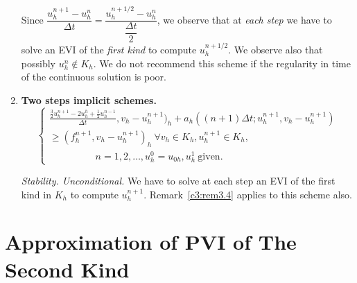 \begin{enumerate}
Since $\dfrac {u^{n+1}_h -u^n_h} {\Delta  t} = \dfrac{u^{n+1/2}_h
  -u^n_h} {\dfrac{\Delta  t}{2}}$, we observe that at \textit{each
  step} we have to solve an EVI of the \textit {first kind} to compute
$u^{n+1/2}_h$. We observe also that possibly $u^n_h \notin K_h$. We do
not recommend this scheme if the regularity in time of the continuous
solution is poor. 

\item {\bf Two steps implicit schemes.}
\begin{equation}
\begin{cases}
\frac{\frac{3}{2} u^{n+1}_h - 2u_h^h +\frac{1}{2} u^{n-1}_h }{\Delta  t}, v_h -u^{n+1}_h )_h +a_h ((n+1) \Delta  t; u^{n+1}_h, v_h -u^{n+1}_h) \\
\geq (f^{n+1}_h, v_h -u^{n+1}_h)_h \ \forall v_h \in K_h, u^{n+1}_h
\in K_h,\\ 
\hspace{2cm}n = 1, 2, \ldots, u^0_h= u_{0h}, u^1_h  ~\text{given}.
\tag{4.4}\label{c3:eq4.4}  
\end{cases}
\end{equation}

\textit {Stability. Unconditional.} We have to solve at each step an
EVI of the first kind in $K_h$ to compute
$u^{n+1}_h$. Remark~\ref{c3:rem3.4} applies to this scheme also. 
\end{enumerate}

\section{Approximation of PVI of The Second Kind}\label{c3:s5}


